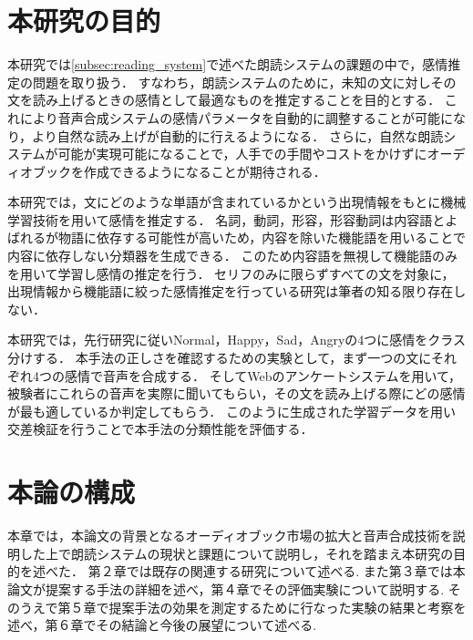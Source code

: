 

\section{本研究の目的}
本研究では\ref{subsec:reading_system}で述べた朗読システムの課題の中で，感情推定の問題を取り扱う．
すなわち，朗読システムのために，未知の文に対しその文を読み上げるときの感情として最適なものを推定することを目的とする．
これにより音声合成システムの感情パラメータを自動的に調整することが可能になり，より自然な読み上げが自動的に行えるようになる．
さらに，自然な朗読システムが可能が実現可能になることで，人手での手間やコストをかけずにオーディオブックを作成できるようになることが期待される．


本研究では，文にどのような単語が含まれているかという出現情報をもとに機械学習技術を用いて感情を推定する．
名詞，動詞，形容，形容動詞は内容語とよばれるが物語に依存する可能性が高いため，内容を除いた機能語を用いることで内容に依存しない分類器を生成できる．
このため内容語を無視して機能語のみを用いて学習し感情の推定を行う．
セリフのみに限らずすべての文を対象に，出現情報から機能語に絞った感情推定を行っている研究は筆者の知る限り存在しない．


本研究では，先行研究に従いNormal，Happy，Sad，Angryの4つに感情をクラス分けする．
本手法の正しさを確認するための実験として，まず一つの文にそれぞれ4つの感情で音声を合成する．
そしてWebのアンケートシステムを用いて，被験者にこれらの音声を実際に聞いてもらい，その文を読み上げる際にどの感情が最も適しているか判定してもらう．
このように生成された学習データを用い交差検証を行うことで本手法の分類性能を評価する．


\section{本論の構成}
本章では，本論文の背景となるオーディオブック市場の拡大と音声合成技術を説明した上で朗読システムの現状と課題について説明し，それを踏まえ本研究の目的を述べた．
第２章では既存の関連する研究について述べる.
また第３章では本論文が提案する手法の詳細を述べ，第４章でその評価実験について説明する.
そのうえで第５章で提案手法の効果を測定するために行なった実験の結果と考察を述べ，第６章でその結論と今後の展望について述べる.
